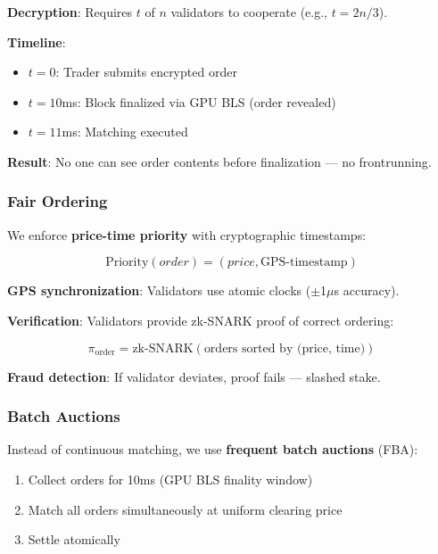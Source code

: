 \documentclass[11pt,letterpaper]{article}
\begin{document}
\textbf{Decryption}: Requires $t$ of $n$ validators to cooperate (e.g., $t = 2n/3$).

\textbf{Timeline}:
\begin{itemize}
    \item $t=0$: Trader submits encrypted order
    \item $t=10$ms: Block finalized via GPU BLS (order revealed)
    \item $t=11$ms: Matching executed
\end{itemize}

\textbf{Result}: No one can see order contents before finalization --- no frontrunning.

\subsubsection{Fair Ordering}

We enforce \textbf{price-time priority} with cryptographic timestamps:

\begin{equation}
\text{Priority}(order) = (price, \text{GPS-timestamp})
\end{equation}

\textbf{GPS synchronization}: Validators use atomic clocks ($\pm$1$\mu$s accuracy).

\textbf{Verification}: Validators provide zk-SNARK proof of correct ordering:

\begin{equation}
\pi_{\text{order}} = \text{zk-SNARK}(\text{orders sorted by (price, time)})
\end{equation}

\textbf{Fraud detection}: If validator deviates, proof fails --- slashed stake.

\subsubsection{Batch Auctions}

Instead of continuous matching, we use \textbf{frequent batch auctions} (FBA):

\begin{enumerate}
    \item Collect orders for 10ms (GPU BLS finality window)
    \item Match all orders simultaneously at uniform clearing price
    \item Settle atomically
\end{enumerate}
\end{document}

